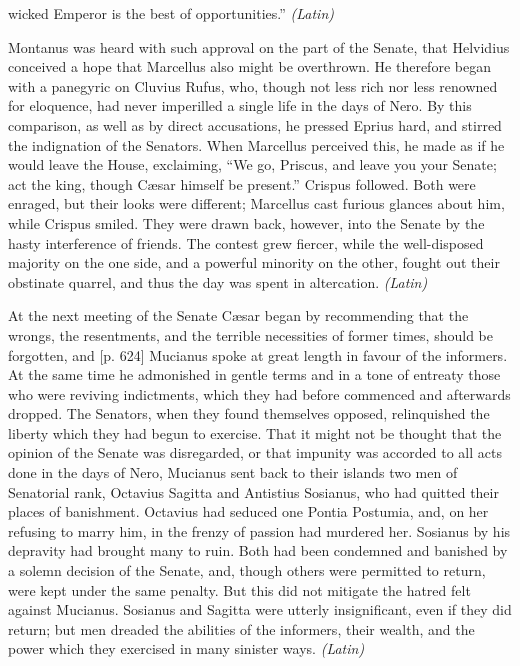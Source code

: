 wicked Emperor is the best of opportunities.'' \emph{(Latin)}


Montanus was heard with such approval on the part of the Senate, that Helvidius conceived a hope that Marcellus also might be overthrown. He therefore began with a panegyric on Cluvius Rufus, who, though not less rich nor less renowned for eloquence, had never imperilled a single life in the days of Nero. By this comparison, as well as by direct accusations, he pressed Eprius hard, and stirred the indignation of the Senators. When Marcellus perceived this, he made as if he would leave the House, exclaiming, ``We go, Priscus, and leave you your Senate; act the king, though Cæsar himself be present.'' Crispus followed. Both were enraged, but their looks were different; Marcellus cast furious glances about him, while Crispus smiled. They were drawn back, however, into the Senate by the hasty interference of friends. The contest grew fiercer, while the well-disposed majority on the one side, and a powerful minority on the other, fought out their obstinate quarrel, and thus the day was spent in altercation. \emph{(Latin)}


At the next meeting of the Senate Cæsar began by recommending that the wrongs, the resentments, and the terrible necessities of former times, should be forgotten, and [p. 624] Mucianus spoke at great length in favour of the informers. At the same time he admonished in gentle terms and in a tone of entreaty those who were reviving indictments, which they had before commenced and afterwards dropped. The Senators, when they found themselves opposed, relinquished the liberty which they had begun to exercise. That it might not be thought that the opinion of the Senate was disregarded, or that impunity was accorded to all acts done in the days of Nero, Mucianus sent back to their islands two men of Senatorial rank, Octavius Sagitta and Antistius Sosianus, who had quitted their places of banishment. Octavius had seduced one Pontia Postumia, and, on her refusing to marry him, in the frenzy of passion had murdered her. Sosianus by his depravity had brought many to ruin. Both had been condemned and banished by a solemn decision of the Senate, and, though others were permitted to return, were kept under the same penalty. But this did not mitigate the hatred felt against Mucianus. Sosianus and Sagitta were utterly insignificant, even if they did return; but men dreaded the abilities of the informers, their wealth, and the power which they exercised in many sinister ways. \emph{(Latin)}

